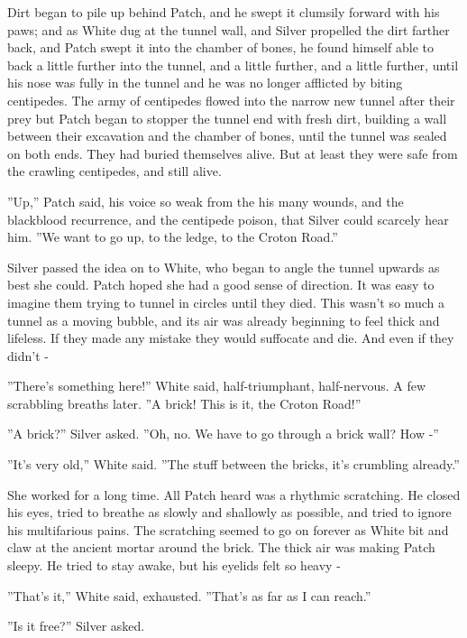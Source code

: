 \documentclass[11pt]{article}
\begin{document}
 Dirt began to pile up behind Patch, and he swept it clumsily forward with his paws; and as White dug at the tunnel wall, and Silver propelled the dirt farther back, and Patch swept it into the chamber of bones, he found himself able to back a little further into the tunnel, and a little further, and a little further, until his nose was fully in the tunnel and he was no longer afflicted by biting centipedes. The army of centipedes flowed into the narrow new tunnel after their prey %
 but Patch began to stopper the tunnel end with fresh dirt, building a wall between their excavation and the chamber of bones, until the tunnel was sealed on both ends. They had buried themselves alive. But at least they were safe from the crawling centipedes, and still alive.\par
 ''Up,'' Patch said, his voice so weak from the his many wounds, and the blackblood recurrence, and the centipede poison, that Silver could scarcely hear him. ''We want to go up, to the ledge, to the Croton Road.''\par
 Silver passed the idea on to White, who began to angle the tunnel upwards as best she could. Patch hoped she had a good sense of direction. It was easy to imagine them trying to tunnel in circles until they died. This wasn't so much a tunnel as a moving bubble, and its air was already beginning to feel thick and lifeless. If they made any mistake they would suffocate and die. And even if they didn't -\par
 ''There's something here!'' White said, half-triumphant, half-nervous. A few scrabbling breaths later. ''A brick! This is it, the Croton Road!''\par
 ''A brick?'' Silver asked. ''Oh, no. We have to go through a brick wall? How -''\par
 ''It's very old,'' White said. ''The stuff between the bricks, it's crumbling already.''\par
 She worked for a long time. All Patch heard was a rhythmic scratching. He closed his eyes, tried to breathe as slowly and shallowly as possible, and tried to ignore his multifarious pains. The scratching seemed to go on forever as White bit and claw at the ancient mortar around the brick. The thick air was making Patch sleepy. He tried to stay awake, but his eyelids felt so heavy -\par
 ''That's it,'' White said, exhausted. ''That's as far as I can reach.''\par
 ''Is it free?'' Silver asked.\par
\end{document}
